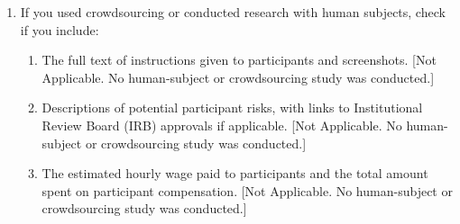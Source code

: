 \begin{enumerate}
  \item If you used crowdsourcing or conducted research with human subjects, check if you include:
  \begin{enumerate}
    \item The full text of instructions given to participants and screenshots. [Not Applicable. No human-subject or crowdsourcing study was conducted.]
    \item Descriptions of potential participant risks, with links to Institutional Review Board (IRB) approvals if applicable. [Not Applicable. No human-subject or crowdsourcing study was conducted.]
    \item The estimated hourly wage paid to participants and the total amount spent on participant compensation. [Not Applicable. No human-subject or crowdsourcing study was conducted.]
  \end{enumerate}

\end{enumerate}
